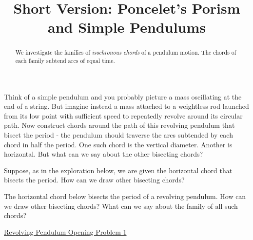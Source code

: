 \documentclass{ximera}
\title{Short Version: Poncelet's Porism and Simple Pendulums}
\begin{document}
\begin{abstract}
We investigate the families of \emph{isochronous chords} of a pendulum motion. The chords of each family subtend arcs of equal time.
\end{abstract}
\maketitle



Think of a simple pendulum and you probably picture a mass oscillating at the end of a string. But imagine instead a mass attached to a weightless rod launched from its low point with sufficient speed to repeatedly revolve around its circular path. Now construct chords around the path of this revolving pendulum that bisect the period - the pendulum should traverse the arcs subtended by each chord in half the period. One such chord is the vertical diameter. Another is horizontal. But what can we say about the other bisecting chords?

Suppose, as in the exploration below, we are given the horizontal chord that bisects the period. How can we draw other bisecting chords?

\begin{exploration}
The horizontal chord below bisects the period of a revolving pendulum. How can we draw other bisecting chords? What can we say about the family of all such chords?

\begin{onlineOnly}
    \begin{center}
\end{center}
\end{onlineOnly}

\href{https://www.desmos.com/calculator/x5fzsfvxdb}{Revolving Pendulum Opening Problem 1}

\end{exploration}
\end{document}
